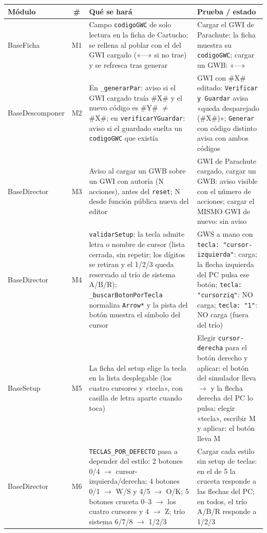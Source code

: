 \begin{xltabular}{\textwidth}{l c >{\RaggedRight\arraybackslash}X >{\RaggedRight\arraybackslash}X}
	\toprule
	\textbf{Módulo} & \textbf{\#} & \textbf{Qué se hará} & \textbf{Prueba / estado} \\
	\midrule
	\endhead
	BaseFicha & M1 & Campo \texttt{codigoGWC} de solo lectura en la ficha de Cartucho; se rellena al poblar con el del GWI cargado («---» si no trae) y se refresca tras generar & Cargar el GWI de Parachute: la ficha muestra su \texttt{codigoGWC}; cargar un GWB: «---» \\
	\midrule
	BaseDescomponer & M2 & En \texttt{\_generarPar}: aviso si el GWI cargado traía \#X\# y el nuevo código es \#Y\# $\neq$ \#X\#; en \texttt{verificarYGuardar}: aviso si el guardado suelta un \texttt{codigoGWC} que existía & GWI con \#X\# editado: \texttt{Verificar y Guardar} avisa «queda desparejado (\#X\#)»; \texttt{Generar} con código distinto avisa con ambos códigos \\
	\midrule
	BaseDirector & M3 & Aviso al cargar un GWB sobre un GWI con autoría (N acciones), antes del \texttt{reset}; N desde función pública nueva del editor & GWI de Parachute cargado, cargar un GWB: aviso visible con el número de acciones; cargar el MISMO GWI de nuevo: sin aviso \\
	\midrule
	BaseDirector & M4 & \texttt{validarSetup}: la tecla admite letra o nombre de cursor (lista cerrada, sin repetir; los dígitos se retiran y el 1/2/3 queda reservado al trío de sistema A/B/R); \texttt{\_buscarBotonPorTecla} normaliza \texttt{Arrow*} y la pista del botón muestra el símbolo del cursor & GWS a mano con \texttt{tecla: "cursor-izquierda"}: carga; la flecha izquierda del PC pulsa ese botón; \texttt{tecla: "cursorziq"}: NO carga; \texttt{tecla: "1"}: NO carga (fuera del trío) \\
	\midrule
	BaseSetup & M5 & La ficha del setup elige la tecla en la lista desplegable (los cuatro cursores y «tecla», con casilla de letra aparte cuando toca) & Elegir \texttt{cursor-derecha} para el botón derecho y aplicar: el botón del simulador lleva $\rightarrow$ y la flecha derecha del PC lo pulsa; elegir «tecla», escribir M y aplicar: el botón lleva M \\
	\midrule
	BaseDirector & M6 & \texttt{TECLAS\_POR\_DEFECTO} pasa a depender del estilo: 2 botones 0/4 $\to$ cursor-izquierda/derecha; 4 botones 0/1 $\to$ W/S y 4/5 $\to$ O/K; 5 botones cruceta 0--3 $\to$ los cuatro cursores y 4 $\to$ Z; trío sistema 6/7/8 $\to$ 1/2/3 & Cargar cada estilo sin setup de teclas: en el de 5 la cruceta responde a las flechas del PC; en todos, el trío A/B/R responde a 1/2/3 \\
	

\end{xltabular}
